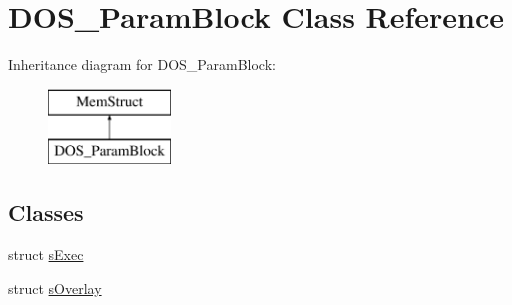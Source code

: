 \hypertarget{classDOS__ParamBlock}{\section{D\-O\-S\-\_\-\-Param\-Block Class Reference}
\label{classDOS__ParamBlock}
}
Inheritance diagram for D\-O\-S\-\_\-\-Param\-Block\-:\begin{figure}[H]
\begin{center}
\leavevmode
\includegraphics[height=2.000000cm]{classDOS__ParamBlock}
\end{center}
\end{figure}
\subsection*{Classes}
\begin{DoxyCompactItemize}
\item 
struct \hyperlink{structDOS__ParamBlock_1_1sExec}{s\-Exec}
\item 
struct \hyperlink{structDOS__ParamBlock_1_1sOverlay}{s\-Overlay}
\end{DoxyCompactItemize}
